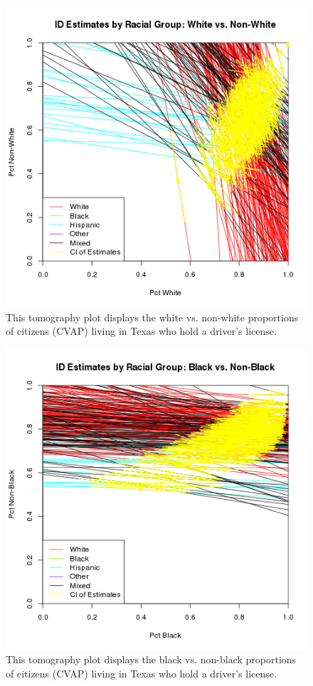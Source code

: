 \documentclass[12pt]{article}
\begin{document}
\begin{figure}[htb]
\begin{centering}
\includegraphics[scale=.75]{figs/CVAP_f3_dl_white.png}
\caption{\label{tomog_white}This tomography plot displays the white vs. non-white proportions of citizens (CVAP)
living in Texas who hold a driver's license.}
\end{centering}
\end{figure}


\begin{figure}[htb]
\begin{centering}
\includegraphics[scale=.75]{figs/CVAP_f3_dl_black.png}
\caption{\label{tomog_black}This tomography plot displays the black vs. non-black proportions of citizens (CVAP)
living in Texas who hold a driver's license.}
\end{centering}
\end{figure}
\end{document}
